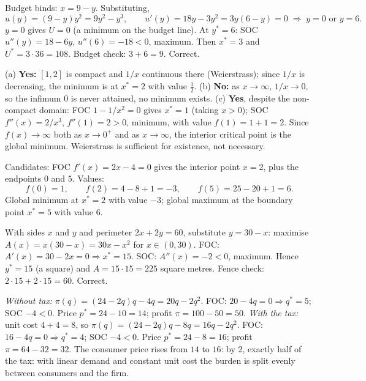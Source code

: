 \begin{solutions}
  \item Budget binds: $x=9-y$. Substituting,
        \[
          u(y)=(9-y)y^{2}=9y^{2}-y^{3}, \qquad
          u'(y)=18y-3y^{2}=3y(6-y)=0
          \;\Rightarrow\; y=0 \text{ or } y=6 .
        \]
        $y=0$ gives $U=0$ (a minimum on the budget line). At
        $y^{*}=6$: SOC $u''(y)=18-6y$, $u''(6)=-18<0$, maximum. Then
        $x^{*}=3$ and $U^{*}=3\cdot 36=108$. Budget check: $3+6=9$.
        Correct.

  \item (a) \textbf{Yes:} $[1,2]$ is compact and $1/x$ continuous
        there (Weierstrass); since $1/x$ is decreasing, the minimum is
        at $x^{*}=2$ with value $\tfrac12$.
        (b) \textbf{No:} as $x\to\infty$, $1/x\to 0$, so the infimum
        $0$ is never attained, no minimum exists.
        (c) \textbf{Yes}, despite the non-compact domain: FOC
        $1-1/x^{2}=0$ gives $x^{*}=1$ (taking $x>0$); SOC
        $f''(x)=2/x^{3}$, $f''(1)=2>0$, minimum, with value
        $f(1)=1+1=2$. Since $f(x)\to\infty$ both as $x\to 0^{+}$ and as
        $x\to\infty$, the interior critical point is the global
        minimum. Weierstrass is sufficient for existence, not
        necessary.

  \item Candidates: FOC $f'(x)=2x-4=0$ gives the interior point
        $x=2$, plus the endpoints $0$ and $5$. Values:
        \[
          f(0)=1, \qquad f(2)=4-8+1=-3, \qquad f(5)=25-20+1=6 .
        \]
        Global minimum at $x^{*}=2$ with value $-3$; global maximum at
        the boundary point $x^{*}=5$ with value $6$.

  \item With sides $x$ and $y$ and perimeter $2x+2y=60$, substitute
        $y=30-x$: maximise $A(x)=x(30-x)=30x-x^{2}$ for
        $x\in(0,30)$. FOC: $A'(x)=30-2x=0 \Rightarrow x^{*}=15$. SOC:
        $A''(x)=-2<0$, maximum. Hence $y^{*}=15$ (a square) and
        $A=15\cdot 15=225$ square metres. Fence check:
        $2\cdot 15+2\cdot 15=60$. Correct.

  \item \emph{Without tax:} $\pi(q)=(24-2q)q-4q=20q-2q^{2}$. FOC:
        $20-4q=0 \Rightarrow q^{*}=5$; SOC $-4<0$. Price
        $p^{*}=24-10=14$; profit $\pi=100-50=50$.
        \emph{With the tax:} unit cost $4+4=8$, so
        $\pi(q)=(24-2q)q-8q=16q-2q^{2}$. FOC:
        $16-4q=0 \Rightarrow q^{*}=4$; SOC $-4<0$. Price
        $p^{*}=24-8=16$; profit $\pi=64-32=32$. The consumer price
        rises from $14$ to $16$: by $2$, exactly half of the tax:
        with linear demand and constant unit cost the burden is split
        evenly between consumers and the firm.
\end{solutions}
